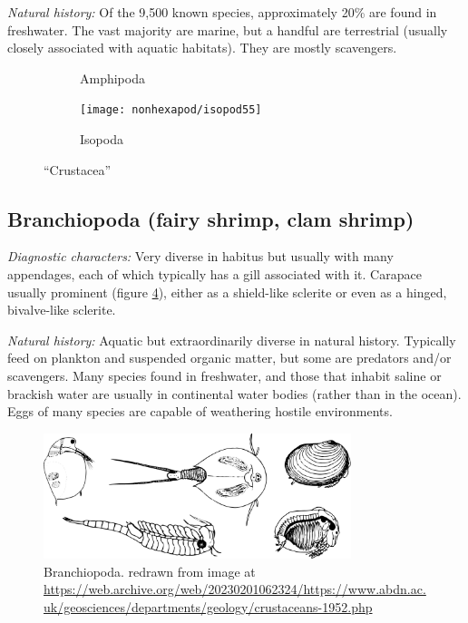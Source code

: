 \noindent{}\textit{Natural history:} Of the 9,500 known species, approximately 20\% are found in freshwater. The vast majority are marine, but a handful are terrestrial (usually closely associated with aquatic habitats). They are mostly scavengers.\vspace{3mm}

\begin{figure}[ht!]
    \centering
    \begin{subfigure}[ht!]{0.4\textwidth}
        \caption{Amphipoda \citep[][Fig. 30]{bhlitem148531crust}}
        \label{fig:amphip}
    \end{subfigure}
    \hfill 
    \begin{subfigure}[ht!]{0.45\textwidth}
        \texttt{[image: nonhexapod/isopod55]}
        \caption{Isopoda \citep[][Fig. 55]{bhlitem148531crust}}
        \label{fig:isopod2}
    \end{subfigure}
    \caption{``Crustacea''} 
\end{figure}

\subsection{Branchiopoda (fairy shrimp, clam shrimp)}
\noindent{}\textit{Diagnostic characters:} Very diverse in habitus but usually with many appendages, each of which typically has a gill associated with it. Carapace usually prominent (figure \ref{fig:branchiopoda}), either as a shield-like sclerite or even as a hinged, bivalve-like sclerite.\vspace{3mm}

\noindent{}\textit{Natural history:} Aquatic but extraordinarily diverse in natural history. Typically feed on plankton and suspended organic matter, but some are predators and/or scavengers. Many species found in freshwater, and those that inhabit saline or brackish water are usually in continental water bodies (rather than in the ocean). Eggs of many species are capable of weathering hostile environments.\vspace{3mm}

\begin{figure}[ht!]
  \centering
    \includegraphics[width=0.8\textwidth]{sections/img/nonhexapod/branchiopoda.pdf}
  \caption{Branchiopoda. redrawn from image at \url{https://web.archive.org/web/20230201062324/https://www.abdn.ac.uk/geosciences/departments/geology/crustaceans-1952.php}}
  \label{fig:branchiopoda}
\end{figure}

